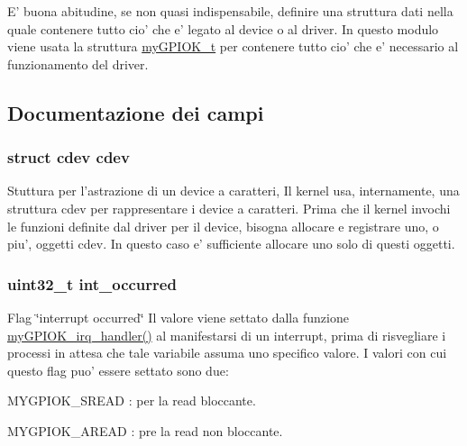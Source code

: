 E' buona abitudine, se non quasi indispensabile, definire una struttura dati nella quale contenere tutto cio' che e' legato al device o al driver. In questo modulo viene usata la struttura \hyperlink{structmy_g_p_i_o_k__t}{my\+G\+P\+I\+O\+K\+\_\+t} per contenere tutto cio' che e' necessario al funzionamento del driver. 

\subsection{Documentazione dei campi}
\hypertarget{structmy_g_p_i_o_k__t_acba682fe45d5a1501790dbdb1d99bd6a}{
\subsubsection[{cdev}]{\setlength{\rightskip}{0pt plus 5cm}struct cdev cdev}}\label{structmy_g_p_i_o_k__t_acba682fe45d5a1501790dbdb1d99bd6a}
Stuttura per l'astrazione di un device a caratteri, Il kernel usa, internamente, una struttura cdev per rappresentare i device a caratteri. Prima che il kernel invochi le funzioni definite dal driver per il device, bisogna allocare e registrare uno, o piu', oggetti cdev. In questo caso e' sufficiente allocare uno solo di questi oggetti. \hypertarget{structmy_g_p_i_o_k__t_a6fd94ecf2bef1aa7bd105577b660a112}{
\subsubsection[{int\+\_\+occurred}]{\setlength{\rightskip}{0pt plus 5cm}uint32\+\_\+t int\+\_\+occurred}}\label{structmy_g_p_i_o_k__t_a6fd94ecf2bef1aa7bd105577b660a112}
Flag \char`\"{}interrupt occurred\char`\"{} Il valore viene settato dalla funzione \hyperlink{group___kernel-_module_ga2fc230a12a97aa63e43b2dc4aec73511}{my\+G\+P\+I\+O\+K\+\_\+irq\+\_\+handler()} al manifestarsi di un interrupt, prima di risvegliare i processi in attesa che tale variabile assuma uno specifico valore. I valori con cui questo flag puo' essere settato sono due\+:
\begin{DoxyItemize}
\item M\+Y\+G\+P\+I\+O\+K\+\_\+\+S\+R\+E\+A\+D \+: per la read bloccante.
\item M\+Y\+G\+P\+I\+O\+K\+\_\+\+A\+R\+E\+A\+D \+: pre la read non bloccante.
\end{DoxyItemize}

